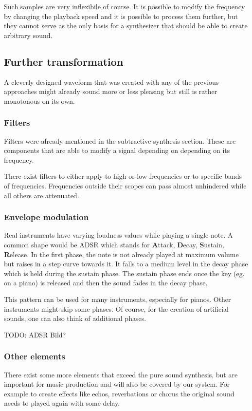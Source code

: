 				Such samples are very inflexibile of course.
				It is possible to modify the frequency by changing the playback speed and it is possible to	process them further, but they cannot serve as the only basis for a synthesizer that should be able to create arbitrary sound.			
		\subsection{Further transformation}

			A cleverly designed waveform that was created with any of the previous approaches might already sound more or less pleasing but still is rather monotonous on its own.
			
			\subsubsection{Filters} 
				\label{subsec:filters}
				Filters were already mentioned in the subtractive synthesis section. 
				These are components that are able to modify a signal depending on depending on its frequency.
				
				There exist filters to either apply to high or low frequencies or to specific bands of frequencies.
				Frequencies outside their scopes can pass almost unhindered while all others are attenuated.
			\subsubsection{Envelope modulation}
				Real instruments have varying loudness values while playing a single note.
				A common shape would be	ADSR which stands for \textbf{A}ttack, \textbf{D}ecay, \textbf{S}ustain, \textbf{R}elease.
				In the first phase, the note is not already played at maximum volume but raises in a step curve towards it.
				It falls to a medium level in the decay phase which is held during the sustain phase.
				The sustain phase ends once the key (eg. on a piano) is released and then the sound fades in the decay phase.
				
				This pattern can be used for many instruments, especially for pianos. 
				Other instruments might skip some phases. 
				Of course, for the creation of artificial sounds, one can also think of additional phases.
			
				TODO: ADSR Bild?
				
			\subsubsection{Other elements}
				There exist some more elements that exceed the pure sound synthesis, but are important for music production and will also be covered by our system.
				For example to create effects like echos, reverbations or chorus the original sound needs to played again with some delay.
			

